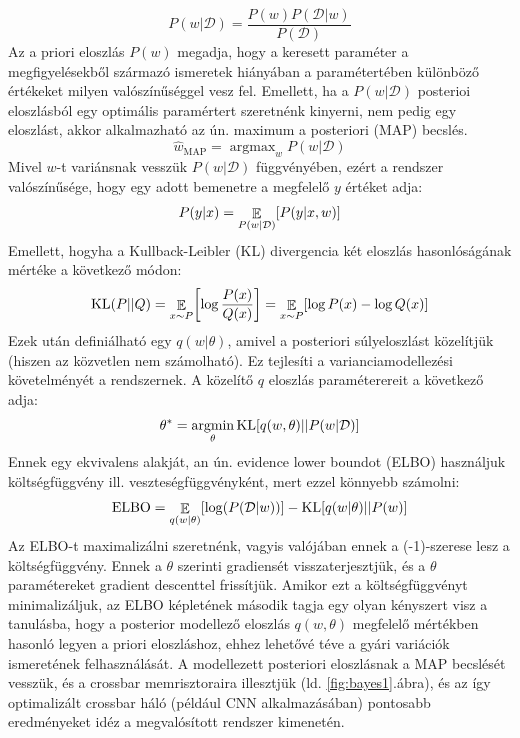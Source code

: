 \documentclass[twoside]{article}
\newcommand\abra[1]{\ref{#1}.ábra}
\DeclareMathOperator\argmin{argmin}
\DeclareMathOperator\argmax{argmax}
\DeclareMathOperator\E{\mathbb{E}}
\DeclareMathOperator\KL{KL}
\begin{document}
	\begin{equation}
		P(w|\mathcal{D}) = \frac{P(w)P(\mathcal{D}|w)}{P(\mathcal{D})}
	\end{equation}
	Az a priori eloszlás $P(w)$ megadja, hogy a keresett paraméter a megfigyelésekből származó ismeretek hiányában a paramétertében különböző értékeket milyen valószínűséggel vesz fel\cite{pataki2006}. Emellett, ha a $P(w|\mathcal{D})$ posterioi eloszlásból egy optimális paramértert szeretnénk kinyerni, nem pedig egy eloszlást, akkor alkalmazható az ún. maximum a posteriori (MAP) becslés. \begin{equation}
		\hat{w}_\text{MAP} = \argmax_w P(w|\mathcal{D})
	\end{equation}
	Mivel $w$-t variánsnak vesszük $P(w|\mathcal{D})$ függvényében, ezért a rendszer valószínűsége, hogy egy adott bemenetre a megfelelő $y$ értéket adja:
	\begin{equation}
		P(y|x) = \E_{P(w|\mathcal{D})}\mleft[P(y|x, w)\mright]
	\end{equation}
	Emellett, hogyha a Kullback-Leibler (KL) divergencia két eloszlás hasonlóságának mértéke a következő módon\cite{goodfellow2016}:
	\begin{equation}
		\KL(P||Q) = \E_{x\sim P}\mleft[\log\frac{P(x)}{Q(x)}\mright] = \E_{x\sim P} \mleft[\log P(x) - \log Q(x)\mright]
	\end{equation}
	Ezek után definiálható egy $q(w|\theta)$, amivel a posteriori súlyeloszlást közelítjük (hiszen az közvetlen nem számolható). Ez tejlesíti a varianciamodellezési követelményét a rendszernek. A közelítő $q$ eloszlás paraméterereit a következő adja:
	\begin{equation}
		\theta^* =  \argmin_\theta \KL\mleft[q(w,\theta)||P(w|\mathcal{D})\mright]
	\end{equation}
	Ennek egy ekvivalens alakját, an ún. evidence lower boundot (ELBO) használjuk költségfüggvény ill. veszteségfüggvényként, mert ezzel könnyebb számolni:
	\begin{equation}
		\text{ELBO} = \E_{q(w|\theta)}\mleft[\log(P(\mathcal{D}|w))\mright]-\KL\mleft[q(w|\theta)||P(w)\mright]
	\end{equation}
	Az ELBO-t maximalizálni szeretnénk, vagyis valójában ennek a (-1)-szerese lesz a költségfüggvény. Ennek a $\theta$ szerinti gradiensét visszaterjesztjük, és a $\theta$ paramétereket gradient descenttel frissítjük. Amikor ezt a költségfüggvényt minimalizáljuk, az ELBO képletének második tagja egy olyan kényszert visz a tanulásba, hogy a posterior modellező eloszlás $q(w,\theta)$ megfelelő mértékben hasonló legyen a priori eloszláshoz, ehhez lehetővé téve a gyári variációk ismeretének felhasználását. A modellezett posteriori eloszlásnak a MAP becslését vesszük, és a crossbar memrisztoraira illesztjük (ld. \abra{fig:bayes1}), és az így optimalizált crossbar háló (például CNN alkalmazásában) pontosabb eredményeket idéz a megvalósított rendszer kimenetén.
\end{document}
